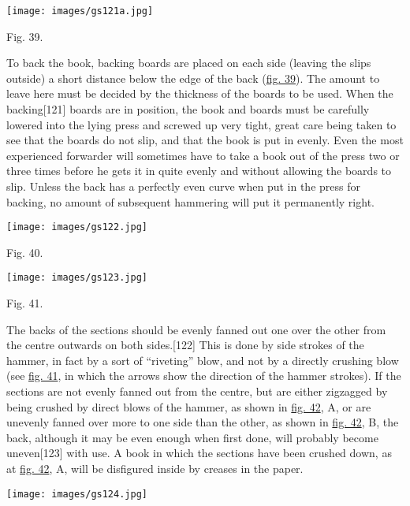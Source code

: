 \documentclass[
]{article}
\begin{document}
\protect\hypertarget{Fig_39}{}{}
\texttt{[image: images/gs121a.jpg]}

Fig. 39.

To back the book, backing boards are placed on each side (leaving the
slips outside) a short distance below the edge of the back
(\protect\hyperlink{Fig_39}{fig. 39}). The amount to leave here must be
decided by the thickness of the boards to be used. When the
backing{\protect\hypertarget{Page_121}{}{{[}121{]}}} boards are in
position, the book and boards must be carefully lowered into the lying
press and screwed up very tight, great care being taken to see that the
boards do not slip, and that the book is put in evenly. Even the most
experienced forwarder will sometimes have to take a book out of the
press two or three times before he gets it in quite evenly and without
allowing the boards to slip. Unless the back has a perfectly even curve
when put in the press for backing, no amount of subsequent hammering
will put it permanently right.

\protect\hypertarget{Fig_40}{}{}
\texttt{[image: images/gs122.jpg]}

Fig. 40.

\protect\hypertarget{Fig_41}{}{}
\texttt{[image: images/gs123.jpg]}

Fig. 41.

The backs of the sections should be evenly fanned out one over the other
from the centre outwards on both
sides.{\protect\hypertarget{Page_122}{}{{[}122{]}}} This is done by side
strokes of the hammer, in fact by a sort of ``riveting'' blow, and not
by a directly crushing blow (see \protect\hyperlink{Fig_41}{fig. 41}, in
which the arrows show the direction of the hammer strokes). If the
sections are not evenly fanned out from the centre, but are either
zigzagged by being crushed by direct blows of the hammer, as shown in
\protect\hyperlink{Fig_42}{fig. 42}, A, or are unevenly fanned over more
to one side than the other, as shown in \protect\hyperlink{Fig_42}{fig.
42}, B, the back, although it may be even enough when first done, will
probably become uneven{\protect\hypertarget{Page_123}{}{{[}123{]}}} with
use. A book in which the sections have been crushed down, as at
\protect\hyperlink{Fig_42}{fig. 42}, A, will be disfigured inside by
creases in the paper.\protect\hypertarget{Fig_43}{}{}

\protect\hypertarget{Fig_42}{}{}
\texttt{[image: images/gs124.jpg]}
\end{document}
